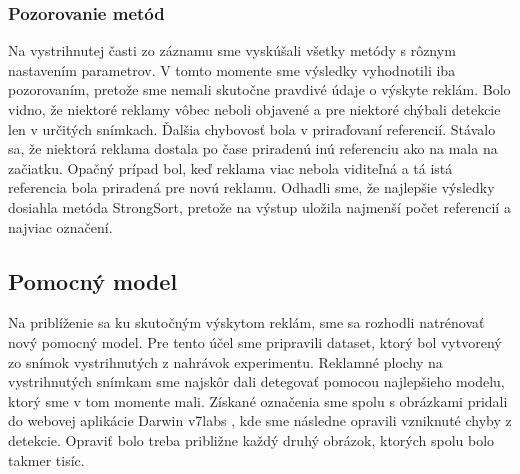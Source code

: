 \subsubsection{Pozorovanie metód}

Na vystrihnutej časti zo záznamu sme vyskúšali všetky metódy s rôznym nastavením parametrov. V tomto momente sme výsledky vyhodnotili iba pozorovaním, pretože sme nemali skutočne pravdivé údaje o výskyte reklám. Bolo vidno, že niektoré reklamy vôbec neboli objavené a pre niektoré chýbali detekcie len v určitých snímkach. Ďalšia chybovosť bola v priraďovaní referencií. Stávalo sa, že niektorá reklama dostala po čase priradenú inú referenciu ako na mala na začiatku. Opačný prípad bol, keď reklama viac nebola viditeľná a tá istá referencia bola priradená pre novú reklamu. Odhadli sme, že najlepšie výsledky dosiahla metóda StrongSort, pretože na výstup uložila najmenší počet referencií a najviac označení.


\subsection{Pomocný model}

Na priblíženie sa ku skutočným výskytom reklám, sme sa rozhodli natrénovať nový pomocný model. Pre tento účel sme pripravili dataset, ktorý bol vytvorený zo snímok vystrihnutých z nahrávok experimentu. Reklamné plochy na vystrihnutých snímkam sme najskôr dali detegovať pomocou najlepšieho modelu, ktorý sme v tom momente mali. Získané označenia sme spolu s obrázkami pridali do webovej aplikácie Darwin v7labs \cite{v7}, kde sme následne opravili vzniknuté chyby z detekcie. Opraviť bolo treba približne každý druhý obrázok, ktorých spolu bolo takmer tisíc.

